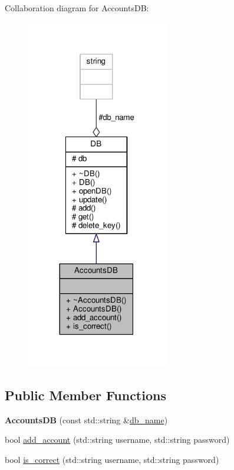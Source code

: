 Collaboration diagram for Accounts\+DB\+:\nopagebreak
\begin{figure}[H]
\begin{center}
\leavevmode
\includegraphics[width=176pt]{db/d5f/classAccountsDB__coll__graph}
\end{center}
\end{figure}
\subsection*{Public Member Functions}
\begin{DoxyCompactItemize}
\item 
{\bfseries Accounts\+DB} (const std\+::string \&\hyperlink{classDB_a8c58fbd6650f3d5850adf699d1ee7ada}{db\+\_\+name})\hypertarget{classAccountsDB_a9fd585eb1722709c4c4f3a965e28a4f9}{}\label{classAccountsDB_a9fd585eb1722709c4c4f3a965e28a4f9}

\item 
bool \hyperlink{classAccountsDB_a4dcb9ceac8065e4ded4e8f812fb0fad6}{add\+\_\+account} (std\+::string username, std\+::string password)
\item 
bool \hyperlink{classAccountsDB_ad7a862b0e456a90fcc3074934de83d66}{is\+\_\+correct} (std\+::string username, std\+::string password)
\end{DoxyCompactItemize}
